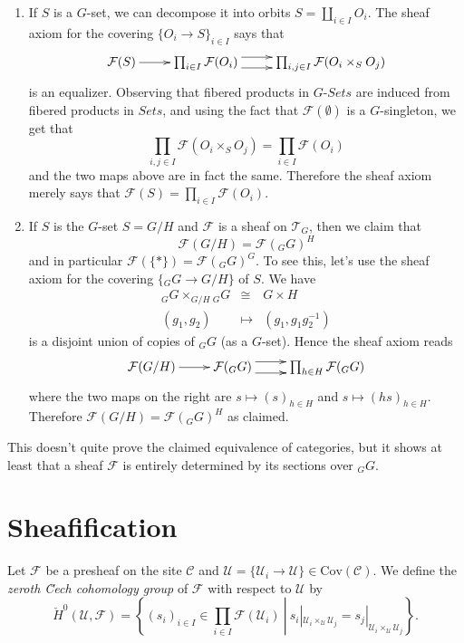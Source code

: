 \begin{enumerate}
\item 
If $S$ is a $G$-set, we can decompose it into orbits $S = \coprod_{i\in I} 
O_i$. The sheaf axiom for the covering $\{O_i \to S\}_{i\in I}$ says that 
$$
\xymatrix{
\mathcal{F}(S) \ar[r] &
\prod_{i\in I} \mathcal{F}(O_i) \ar@<1ex>[r] \ar@<-1ex>[r] &
\prod_{i,j \in I} \mathcal{F}(O_i \times_S O_j)
}
$$
is an equalizer. Observing that fibered products in $G\textit{-Sets}$ are 
induced from fibered products in $\textit{Sets}$, and using the fact that 
$\mathcal{F}(\emptyset)$ is a $G$-singleton, we get that 
$$
\prod_{i,j \in I} \mathcal{F}(O_i \times_S O_j) = \prod_{i \in I} 
\mathcal{F}(O_i)
$$
and the two maps above are in fact the same. Therefore the sheaf axiom merely 
says that $\mathcal{F}(S) = \prod_{i\in I} \mathcal{F}(O_i)$.
\item
If $S$ is the $G$-set $S= G/H$ and $\mathcal{F}$ is a sheaf on $\mathcal{T}_G$, 
then we claim that
$$
\mathcal{F}(G/H) = \mathcal{F}({}_G G)^H
$$
and in particular $\mathcal{F}(\{*\}) = \mathcal{F}({}_G G)^G$. To see this, 
let's use the sheaf axiom for the covering $\{ {}_G G \to G/H \}$ of $S$. We 
have 
\begin{eqnarray*}
{}_G G  \times_{G/H} {}_G G & \cong & G \times H \\
(g_1, g_2) & \longmapsto & (g_1, g_1 g_2^{-1})
\end{eqnarray*}
is a disjoint union of copies of ${}_G G$ (as a $G$-set). Hence the sheaf axiom 
reads
$$
\xymatrix{
\mathcal{F} (G/H) \ar[r] &
\mathcal{F}({}_G G) \ar@<1ex>[r] \ar@<-1ex>[r] &
\prod_{h\in H} \mathcal{F}({}_G G)
}
$$
where the two maps on the right are $s \mapsto  (s)_{h \in H}$ and $s \mapsto  
(hs)_{h \in H}$. Therefore $\mathcal{F}(G/H) = \mathcal{F}({}_G G)^H$ as 
claimed.
\end{enumerate}
This doesn't quite prove the claimed equivalence of categories, but it shows at 
least that a sheaf $\mathcal{F}$ is entirely determined by its sections over 
${}_G G$.

\section{Sheafification}
\label{section-sheafification}

\begin{definition}
\label{definition-0-cech}
Let $\mathcal{F}$ be a presheaf on the site $\mathcal{C}$ and
$\mathcal{U} = \{\mathcal{U}_i \to \mathcal{U}\} \in \text{Cov} (\mathcal{C})$.
We define the {\it zeroth \u Cech cohomology group} of
$\mathcal{F}$ with respect to $\mathcal{U}$ by
$$
\check H^0 (\mathcal{U}, \mathcal{F}) =
\left\{\left.
(s_i)_{i\in I} \in  \prod_{i\in I }\mathcal{F}(\mathcal{U}_i) \ \right| \ s_i 
|_{\mathcal{U}_i \times_\mathcal{U} \mathcal{U}_j} = s_j |_{\mathcal{U}_i 
\times_\mathcal{U} \mathcal{U}_j} \right\}.
$$
\end{definition}


